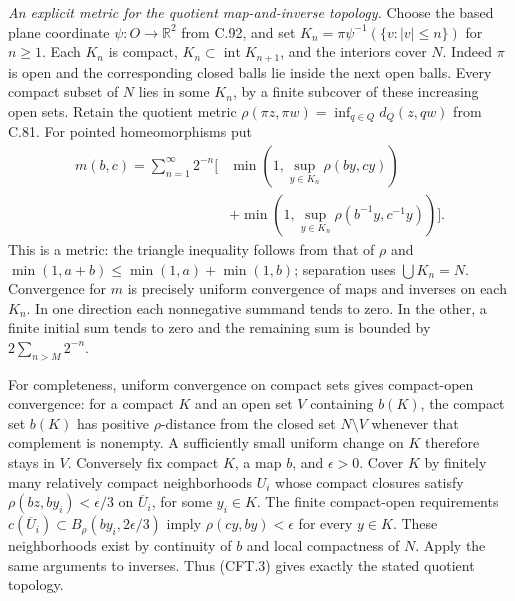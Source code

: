 \emph{An explicit metric for the quotient map-and-inverse topology.}
Choose the based plane coordinate $\psi:O\to\mathbb R^2$ from
C.92, and set
$K_n=\pi\psi^{-1}(\{v:|v|\leq n\})$ for $n\geq1$.
Each $K_n$ is compact,
$K_n\subset\operatorname{int}K_{n+1}$, and the interiors cover $N$.
Indeed $\pi$ is open and the corresponding closed balls lie
inside the next open balls. Every compact subset of $N$ lies
in some $K_n$, by a finite subcover of these increasing open
sets. Retain the quotient metric
$\rho(\pi z,\pi w)=\inf_{q\in Q}d_Q(z,qw)$ from C.81.
For pointed homeomorphisms put
\[
\begin{split}
 m(b,c)=\sum_{n=1}^{\infty}2^{-n}\bigg[
 &\min\!\left(1,\sup_{y\in K_n}\rho(by,cy)\right)\\
 &+\min\!\left(1,\sup_{y\in K_n}\rho(b^{-1}y,c^{-1}y)\right)
 \bigg].
\end{split}                                                    \tag{CFT.3}
\]
This is a metric: the triangle inequality follows from that of
$\rho$ and $\min(1,a+b)\leq\min(1,a)+\min(1,b)$; separation
uses $\bigcup K_n=N$. Convergence for $m$ is precisely uniform
convergence of maps and inverses on each $K_n$. In one direction
each nonnegative summand tends to zero. In the other, a finite
initial sum tends to zero and the remaining sum is bounded by
$2\sum_{n>M}2^{-n}$.

For completeness, uniform convergence on compact sets gives
compact-open convergence: for a compact $K$ and an open set
$V$ containing $b(K)$, the compact set $b(K)$ has positive
$\rho$-distance from the closed set $N\setminus V$ whenever
that complement is nonempty. A sufficiently small uniform
change on $K$ therefore stays in $V$.
Conversely fix compact $K$, a map $b$, and $\epsilon>0$.
Cover $K$ by finitely many relatively compact neighborhoods
$U_i$ whose compact closures satisfy
$\rho(bz,by_i)<\epsilon/3$ on $\overline U_i$, for some
$y_i\in K$. The finite compact-open requirements
$c(\overline U_i)\subset B_\rho(by_i,2\epsilon/3)$ imply
$\rho(cy,by)<\epsilon$ for every $y\in K$.
These neighborhoods exist by continuity of $b$ and local
compactness of $N$. Apply the same arguments to inverses.
Thus (CFT.3) gives exactly the stated quotient topology.

